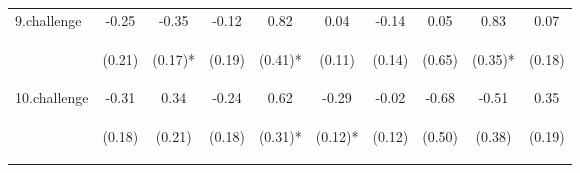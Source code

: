\begin{center}
\begin{tabular}{lccccccccc}
\noalign{\smallskip}9.challenge & -0.25 & -0.35 & -0.12 & 0.82 & 0.04 & -0.14 & 0.05 & 0.83 & 0.07\\
 & \begin{footnotesize}(0.21)\end{footnotesize} & \begin{footnotesize}(0.17)*\end{footnotesize} & \begin{footnotesize}(0.19)\end{footnotesize} & \begin{footnotesize}(0.41)*\end{footnotesize} & \begin{footnotesize}(0.11)\end{footnotesize} & \begin{footnotesize}(0.14)\end{footnotesize} & \begin{footnotesize}(0.65)\end{footnotesize} & \begin{footnotesize}(0.35)*\end{footnotesize} & \begin{footnotesize}(0.18)\end{footnotesize}\\
\noalign{\smallskip}10.challenge & -0.31 & 0.34 & -0.24 & 0.62 & -0.29 & -0.02 & -0.68 & -0.51 & 0.35\\
 & \begin{footnotesize}(0.18)\end{footnotesize} & \begin{footnotesize}(0.21)\end{footnotesize} & \begin{footnotesize}(0.18)\end{footnotesize} & \begin{footnotesize}(0.31)*\end{footnotesize} & \begin{footnotesize}(0.12)*\end{footnotesize} & \begin{footnotesize}(0.12)\end{footnotesize} & \begin{footnotesize}(0.50)\end{footnotesize} & \begin{footnotesize}(0.38)\end{footnotesize} & \begin{footnotesize}(0.19)\end{footnotesize}\\

\end{tabular}
\end{center}
